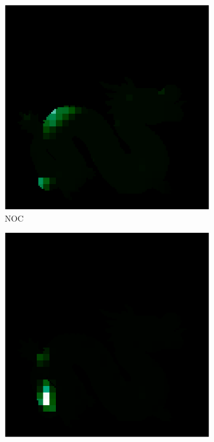\begin{figure}[H]
\begin{minipage}{0.32\linewidth}
		\begin{subfigure}[t]{0.45\linewidth}
			\includegraphics[width=\linewidth]{./Figures/feature_map_gcnn/feature_map_gcnn-noc_93.png}
			\caption{NOC}
		\end{subfigure}
		\begin{subfigure}[t]{0.45\linewidth}
			\includegraphics[width=\linewidth]{./Figures/feature_map_gcnn/feature_map_gcnn-noc_104.png}
		\end{subfigure}
		

\end{minipage}
\end{figure}
